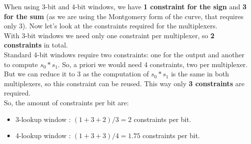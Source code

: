 When using 3-bit and 4-bit windows, we have {{\bf 1 constraint for the sign}} and {{\bf 3 for the sum}} (as we are using the Montgomery form of the curve, that requires only 3). Now let's look at the constraints required for the multiplexers. \\

With 3-bit windows we need only one constraint per multiplexer, so {\bf 2 constraints} in total. \\

Standard 4-bit windows require two constraints: one for the output and another to compute $s_0*s_1$. So, a priori we would need 4 constraints, two per multiplexer. But we can reduce it to 3 as the computation of $s_0*s_1$ is the same in both multiplexers, so this constraint can be reused. This way only {{\bf 3 constraints}} are required. \\

So, the amount of constraints per bit are:
\begin{itemize}
	\item 3-lookup window : %
		$ (1+3+2)/3 = 2 $ constraints per bit.
	\item 4-lookup window : %
		$ (1 +3+3)/4 = 1.75 $ constraints per bit. 
\end{itemize}

